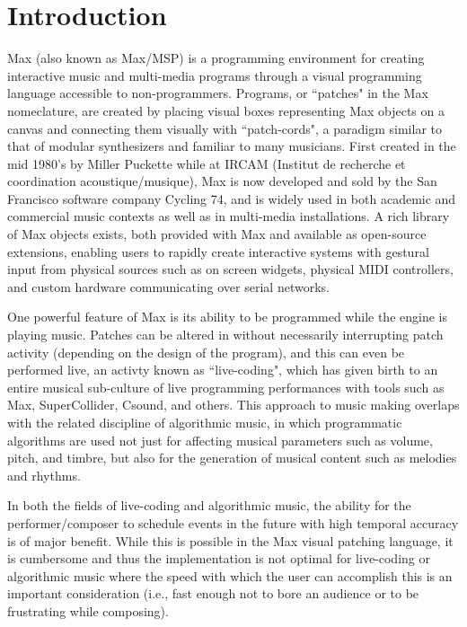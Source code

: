 \documentclass[acmsmall]{acmart}
\begin{document}
\maketitle

\section{Introduction}

Max (also known as Max/MSP) is a programming environment for creating interactive 
music and multi-media programs through a visual programming language accessible 
to non-programmers.  Programs, or ``patches" in the Max nomeclature, are created by placing
visual boxes representing Max objects on a canvas and connecting them visually with
``patch-cords", a paradigm similar to that of modular synthesizers and familiar to many musicians.
First created in the mid 1980's by Miller Puckette while at IRCAM 
(Institut de recherche et coordination acoustique/musique), 
Max is now developed and sold by the San Francisco software company Cycling 74,
and is widely used in both academic and commercial music contexts as well
as in multi-media installations. A rich library of Max objects exists, 
both provided with Max and available as open-source 
extensions, enabling users to rapidly create interactive systems with gestural 
input from physical sources such as on screen widgets, physical MIDI controllers,
and custom hardware communicating over serial networks.


One powerful feature of Max is its ability to be programmed
while the engine is playing music. Patches can be altered in 
without necessarily interrupting patch activity (depending on the design
of the program), and this can
even be performed live, an activty known as ``live-coding", which has given
birth to an entire musical sub-culture of live programming performances
with tools such as Max, SuperCollider, Csound, and others. 
This approach to music making overlaps with the related discipline of 
algorithmic music, in which programmatic algorithms are used
not just for affecting musical parameters such as volume, pitch, and timbre, 
but also for the generation of musical content such as melodies
and rhythms.

In both the fields of live-coding and algorithmic music, the ability for
the performer/composer to schedule events in the future with high temporal
accuracy is of major benefit. While this is possible in the Max visual
patching language, it is cumbersome and thus the implementation is not
optimal for live-coding or algorithmic music where the speed with which
the user can accomplish this is an important consideration (i.e., fast
enough not to bore an audience or to be frustrating while composing).
\end{document}
